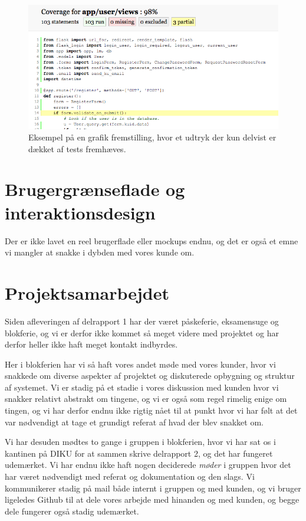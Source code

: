 \documentclass[11pt, a4paper]{article}
\begin{document}
\begin{figure}[h]
    \centering
    \includegraphics[width=0.8\linewidth]{figures/code_coverage.png}
    \caption{Eksempel på en grafik fremstilling, hvor et udtryk der kun delvist er dækket af tests fremhæves.}
    \label{fig:code_coverage}
\end{figure}

\section{Brugergrænseflade og interaktionsdesign}
\label{sec:brugergraenseflade}
Der er ikke lavet en reel brugerflade eller mockups endnu, og det er også et emne vi mangler at snakke i dybden med vores kunde om.

\section{Projektsamarbejdet}
\label{sec:projektsamarbejdet}
Siden afleveringen af delrapport 1 har der været påskeferie, eksamensuge og blokferie, og vi er derfor ikke kommet så meget videre med projektet og har derfor heller ikke haft meget kontakt indbyrdes.

Her i blokferien har vi så haft vores andet møde med vores kunder, hvor vi snakkede om diverse aspekter af projektet og diskuterede opbygning og struktur af systemet. Vi er stadig på et stadie i vores diskussion med kunden hvor vi snakker relativt abstrakt om tingene, og vi er også som regel rimelig enige om tingen, og vi har derfor endnu ikke rigtig nået til at punkt hvor vi har følt at det var nødvendigt at tage et grundigt referat af hvad der blev snakket om.

Vi har desuden mødtes to gange i gruppen i blokferien, hvor vi har sat os i kantinen på DIKU for at sammen skrive delrapport 2, og det har fungeret udemærket. Vi har endnu ikke haft nogen deciderede \emph{møder} i gruppen hvor det har været nødvendigt med referat og dokumentation og den slags. Vi kommunikerer stadig på mail både internt i gruppen og med kunden, og vi bruger ligeledes Github til at dele vores arbejde med hinanden og med kunden, og begge dele fungerer også stadig udemærket.
\end{document}
